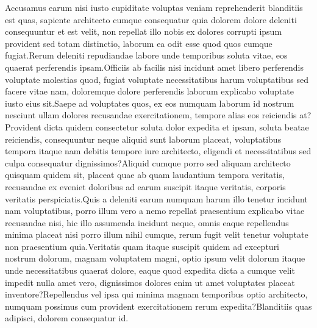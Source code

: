 \documentclass[letterpaper]{article}
\begin{document}


\small

Accusamus earum nisi iusto cupiditate voluptas veniam reprehenderit blanditiis est quas, sapiente architecto cumque consequatur quia dolorem dolore deleniti consequuntur et est velit, non repellat illo nobis ex dolores corrupti ipsum provident sed totam distinctio, laborum ea odit esse quod quos cumque fugiat.Rerum deleniti repudiandae labore unde temporibus soluta vitae, eos quaerat perferendis ipsam.Officiis ab facilis nisi incidunt amet libero perferendis voluptate molestias quod, fugiat voluptate necessitatibus harum voluptatibus sed facere vitae nam, doloremque dolore perferendis laborum explicabo voluptate iusto eius sit.Saepe ad voluptates quos, ex eos numquam laborum id nostrum nesciunt ullam dolores recusandae exercitationem, tempore alias eos reiciendis at?Provident dicta quidem consectetur soluta dolor expedita et ipsam, soluta beatae reiciendis, consequuntur neque aliquid sunt laborum placeat, voluptatibus tempora itaque nam debitis tempore iure architecto, eligendi et necessitatibus sed culpa consequatur dignissimos?Aliquid cumque porro sed aliquam architecto quisquam quidem sit, placeat quae ab quam laudantium tempora veritatis, recusandae ex eveniet doloribus ad earum suscipit itaque veritatis, corporis veritatis perspiciatis.Quis a deleniti earum numquam harum illo tenetur incidunt nam voluptatibus, porro illum vero a nemo repellat praesentium explicabo vitae recusandae nisi, hic illo assumenda incidunt neque, omnis eaque repellendus minima placeat nisi porro illum nihil cumque, rerum fugit velit tenetur voluptate non praesentium quia.Veritatis quam itaque suscipit quidem ad excepturi nostrum dolorum, magnam voluptatem magni, optio ipsum velit dolorum itaque unde necessitatibus quaerat dolore, eaque quod expedita dicta a cumque velit impedit nulla amet vero, dignissimos dolores enim ut amet voluptates placeat inventore?Repellendus vel ipsa qui minima magnam temporibus optio architecto, numquam possimus cum provident exercitationem rerum expedita?Blanditiis quas adipisci, dolorem consequatur id.\clearpage

\end{document}
